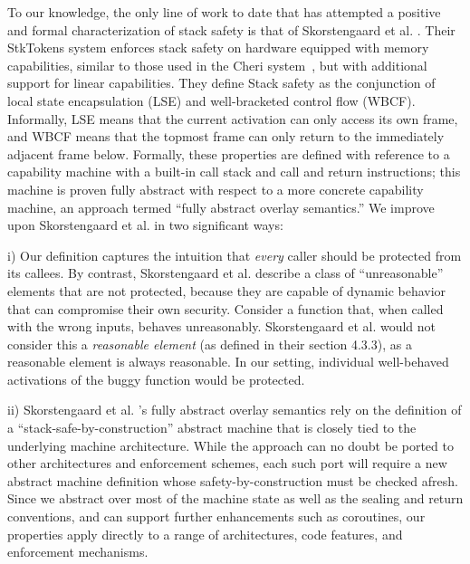 \documentclass[10pt,conference]{ieeetran}%
\theoremstyle{definition}
\begin{document}
{
%
To our knowledge, the only line of work to date that has attempted
a positive and formal characterization of stack safety
is that of Skorstengaard et al. \cite{SkorstengaardSTKJFP}. Their
StkTokens system enforces stack safety on hardware equipped with
memory capabilities, similar to those used in the Cheri system~\cite{Woodruff+14,Chisnall+15}, but
with additional support for linear capabilities.
They define Stack safety as the conjunction of local state encapsulation (LSE) and
well-bracketed control flow (WBCF).
Informally, LSE means that the current activation can only access its own frame,
and WBCF means that the topmost frame can only return to
the immediately adjacent frame below. Formally, these properties are defined
with reference to a capability machine with a built-in call stack and call and return
instructions; this machine is proven fully abstract with respect to a more
concrete capability machine, an approach termed ``fully abstract overlay semantics.''
We improve upon Skorstengaard et al. \cite{SkorstengaardSTKJFP} in two significant ways:

i) Our definition captures the intuition that {\em
  every} caller should be protected from its callees.  By contrast,
  Skorstengaard et al. \cite{SkorstengaardSTKJFP} describe a class of ``unreasonable'' elements
  that are not protected, because they are capable of dynamic behavior that can compromise
  their own security. Consider a function that, when called with the wrong
  inputs, behaves unreasonably. Skorstengaard et al. \cite{SkorstengaardSTKJFP} would not consider this a
  {\em reasonable element} (as defined in their section 4.3.3), as a reasonable
  element is always reasonable. In our setting, individual
  well-behaved activations of the buggy function would be protected.

ii) Skorstengaard et al. \cite{SkorstengaardSTKJFP}'s fully
  abstract overlay semantics rely on the definition of a ``stack-safe-by-construction''
  abstract machine that is closely tied to the underlying machine architecture.
  While the approach can no doubt be ported to other architectures and enforcement
  schemes, each such port will require a new abstract machine definition whose
  safety-by-construction must be checked afresh.
  Since we abstract over most of the machine state as well as the sealing and return conventions, and
  can support further enhancements such as coroutines,
  our properties apply directly to a range of architectures, code features, and enforcement mechanisms.

}
\end{document}
